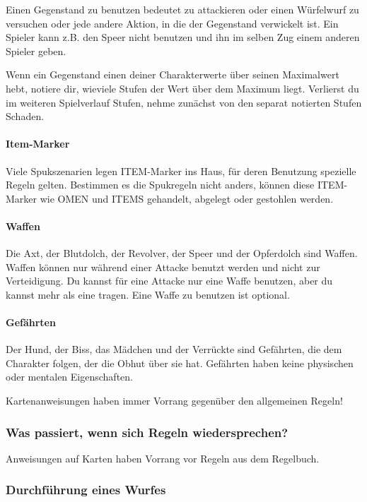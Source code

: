 Einen Gegenstand zu benutzen bedeutet zu attackieren oder einen Würfelwurf zu versuchen oder jede andere Aktion, in die der Gegenstand verwickelt ist. Ein Spieler kann z.B. den Speer nicht benutzen und ihn im selben Zug einem anderen Spieler geben.

Wenn ein Gegenstand einen deiner Charakterwerte über seinen Maximalwert hebt, notiere dir, wieviele Stufen der Wert über dem Maximum liegt. Verlierst du im weiteren Spielverlauf Stufen, nehme zunächst von den separat notierten Stufen Schaden.

\paragraph{Item-Marker}

Viele Spukszenarien legen ITEM-Marker ins Haus, für deren Benutzung spezielle Regeln gelten. Bestimmen es die Spukregeln nicht anders, können diese ITEM-Marker wie OMEN und ITEMS gehandelt, abgelegt oder gestohlen werden.

\paragraph{Waffen} Die Axt, der Blutdolch, der Revolver, der Speer und der Opferdolch sind Waffen. Waffen können nur während einer Attacke benutzt werden und nicht zur Verteidigung. Du kannst für eine Attacke nur eine Waffe benutzen, aber du kannst mehr als eine tragen. Eine Waffe zu benutzen ist optional.

\paragraph{Gefährten}
Der Hund, der Biss, das Mädchen und der Verrückte sind Gefährten, die dem Charakter folgen, der die Obhut über sie hat. Gefährten haben keine physischen oder mentalen Eigenschaften.

Kartenanweisungen haben immer Vorrang gegenüber den allgemeinen Regeln!

\subsubsection{Was passiert, wenn sich Regeln wiedersprechen?}

Anweisungen auf Karten haben Vorrang vor Regeln aus dem Regelbuch.

\subsubsection{Durchführung eines Wurfes}

